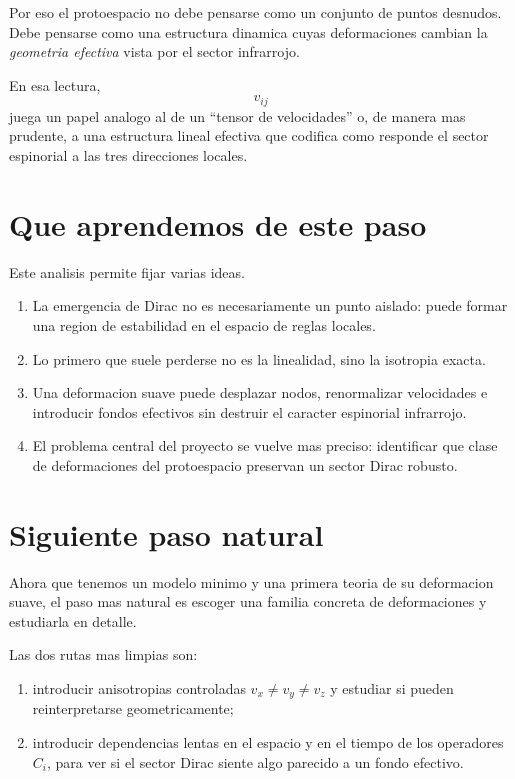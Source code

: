 Por eso el protoespacio no debe pensarse como un conjunto de puntos desnudos. Debe pensarse como una estructura dinamica cuyas deformaciones cambian la \emph{geometria efectiva} vista por el sector infrarrojo.

En esa lectura,
\begin{equation}
v_{ij}
\end{equation}
juega un papel analogo al de un \enquote{tensor de velocidades} o, de manera mas prudente, a una estructura lineal efectiva que codifica como responde el sector espinorial a las tres direcciones locales.

\section{Que aprendemos de este paso}
Este analisis permite fijar varias ideas.

\begin{enumerate}[label=\arabic*.]
    \item La emergencia de Dirac no es necesariamente un punto aislado: puede formar una region de estabilidad en el espacio de reglas locales.
    \item Lo primero que suele perderse no es la linealidad, sino la isotropia exacta.
    \item Una deformacion suave puede desplazar nodos, renormalizar velocidades e introducir fondos efectivos sin destruir el caracter espinorial infrarrojo.
    \item El problema central del proyecto se vuelve mas preciso: identificar que clase de deformaciones del protoespacio preservan un sector Dirac robusto.
\end{enumerate}

\section{Siguiente paso natural}
Ahora que tenemos un modelo minimo y una primera teoria de su deformacion suave, el paso mas natural es escoger una familia concreta de deformaciones y estudiarla en detalle.

Las dos rutas mas limpias son:
\begin{enumerate}[label=\arabic*.]
    \item introducir anisotropias controladas \(v_x\neq v_y\neq v_z\) y estudiar si pueden reinterpretarse geometricamente;
    \item introducir dependencias lentas en el espacio y en el tiempo de los operadores \(C_i\), para ver si el sector Dirac siente algo parecido a un fondo efectivo.
\end{enumerate}

